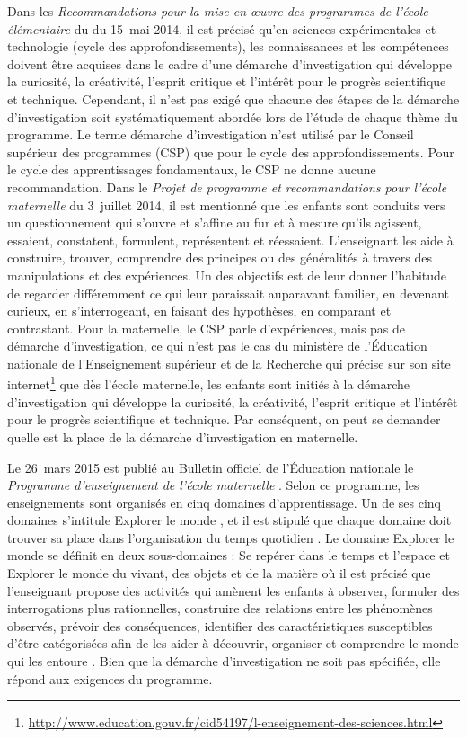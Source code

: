 Dans les \emph{Recommandations pour la mise en œuvre des programmes de l’école élémentaire} du  du 15~mai 2014, il est précisé qu’en sciences expérimentales et technologie (cycle des approfondissements), les connaissances et les compétences doivent être acquises dans le cadre d’une démarche d’investigation qui développe la curiosité, la créativité, l’esprit critique et l’intérêt pour le progrès scientifique et technique. Cependant, il n’est pas exigé que chacune des étapes de la démarche d’investigation soit systématiquement abordée lors de l’étude de chaque thème du programme. Le terme \og démarche d’investigation \fg{} n’est utilisé par le Conseil supérieur des programmes (CSP) que pour le cycle des approfondissements. Pour le cycle des apprentissages fondamentaux, le CSP ne donne aucune recommandation. Dans le \emph{Projet de programme et recommandations pour l’école maternelle} \cite{CSP2014b} du 3~juillet 2014, il est mentionné que les enfants sont conduits vers un questionnement qui s’ouvre et s’affine au fur et à mesure qu’ils agissent, essaient, constatent, formulent, représentent et réessaient. L’enseignant les aide à construire, trouver, comprendre des principes ou des généralités à travers des manipulations et des expériences. Un des objectifs est de leur donner l’habitude de regarder différemment ce qui leur paraissait auparavant familier, en devenant curieux, en s’interrogeant, en faisant des hypothèses, en comparant et contrastant. Pour la maternelle, le CSP parle d’expériences, mais pas de démarche d’investigation, ce qui n’est pas le cas du ministère de l’Éducation nationale de l’Enseignement supérieur et de la Recherche qui précise sur son site internet\footnote{\url{http://www.education.gouv.fr/cid54197/l-enseignement-des-sciences.html}} que \og dès l’école maternelle, les enfants sont initiés à la démarche d’investigation qui développe la curiosité, la créativité, l’esprit critique et l’intérêt pour le progrès scientifique et technique.\fg{} Par conséquent, on peut se demander quelle est la place de la démarche d’investigation en maternelle.

Le 26~mars 2015 est publié au Bulletin officiel de l’Éducation nationale le \textit{Programme d’enseignement de l’école maternelle} \cite{BO2015}. Selon ce programme, les enseignements sont organisés en cinq domaines d’apprentissage. Un de ses cinq domaines s’intitule \og Explorer le monde \fg{}, et il est stipulé que chaque domaine \og doit trouver sa place dans l’organisation du temps quotidien \fg{}. Le domaine \og Explorer le monde \fg{} se définit en deux sous-domaines : \og Se repérer dans le temps et l’espace \fg{} et \og Explorer le monde du vivant, des objets et de la matière \fg{} où il est précisé que \og l’enseignant propose des activités qui amènent les enfants à observer, formuler des interrogations plus rationnelles, construire des relations entre les phénomènes observés, prévoir des conséquences, identifier des caractéristiques susceptibles d’être catégorisées \fg{} afin de \og les aider à découvrir, organiser et comprendre le monde qui les entoure \fg{}. Bien que la démarche d’investigation ne soit pas spécifiée, elle répond aux exigences du programme.

